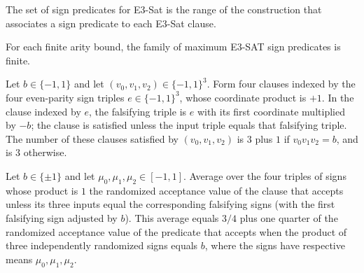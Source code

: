 \begin{definition}
\label{FABL.maxE3SatSignPredicates}
\leanok
{}
The set of sign predicates for E3-Sat is the range of the construction that associates a
sign predicate to each E3-Sat clause.
\end{definition}

\begin{theorem}
\label{FABL.maxE3SatSignPredicates_finite}
\leanok
{}
For each finite arity bound, the family of maximum E3-SAT sign predicates is finite.
\end{theorem}

\begin{theorem}
\label{FABL.sum_e3SatSignReplacementClauses}
\leanok
{}
Let $b\in\{-1,1\}$ and let $(v_0,v_1,v_2)\in\{-1,1\}^3$. Form four clauses indexed by
the four even-parity sign triples $e\in\{-1,1\}^3$, whose coordinate product is $+1$. In
the clause indexed by $e$, the falsifying triple is $e$ with its first coordinate
multiplied by $-b$; the clause is satisfied unless the input triple equals that
falsifying triple. The number of these clauses satisfied by $(v_0,v_1,v_2)$ is $3$ plus
$1$ if $v_0v_1v_2=b$, and is $3$ otherwise.
\end{theorem}

\begin{theorem}
\label{FABL.expect_e3SatSignClause_randomizedValue}
\leanok
{}
Let $b\in\{\pm1\}$ and let $\mu_0,\mu_1,\mu_2\in[-1,1]$. Average over the four triples
of signs whose product is $1$ the randomized acceptance value of the clause that accepts
unless its three inputs equal the corresponding falsifying signs (with the first
falsifying sign adjusted by $b$). This average equals $3/4$ plus one quarter of the
randomized acceptance value of the predicate that accepts when the product of three
independently randomized signs equals $b$, where the signs have respective means
$\mu_0,\mu_1,\mu_2$.
\end{theorem}

